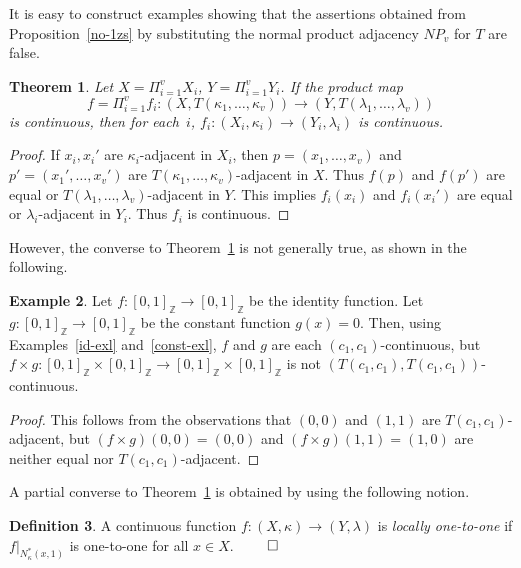 \documentclass{article}
\theoremstyle{plain}
\newtheorem{thm}{Theorem}
\theoremstyle{definition}
\newtheorem{definition}[thm]{Definition}
\newtheorem{exl}[thm]{Example}
\numberwithin{thm}{section}
\def\Z{{\mathbb Z}}
\begin{document}
It is easy to construct examples showing that the assertions obtained
from Proposition~\ref{no-1zs} by
substituting the normal product
adjacency $NP_v$ for $T$ are false.

\begin{thm}
\label{prod-cont-implies-factor}
Let $X=\Pi_{i=1}^v X_i$, $Y=\Pi_{i=1}^v Y_i$.
If the product map
\[ f=\Pi_{i=1}^v f_i: (X, T(\kappa_1,\ldots,\kappa_v)) \to (Y, T(\lambda_1, \ldots, \lambda_v)) \]
is continuous, then for each~$i$,
$f_i: (X_i,\kappa_i) \to (Y_i,\lambda_i)$ is
continuous.
\end{thm}

\begin{proof}
If $x_i, x_i'$ are $\kappa_i$-adjacent
in $X_i$, then
$p=(x_1,\ldots,x_v)$ and $p'=(x_1',\ldots,x_v')$
are $T(\kappa_1,\ldots,\kappa_v)$-adjacent
in $X$. Thus $f(p)$ and $f(p')$ are equal or
$T(\lambda_1,\ldots,\lambda_v)$-adjacent in $Y$.
This implies $f_i(x_i)$ and $f_i(x_i')$ are
equal or $\lambda_i$-adjacent in $Y_i$.
Thus $f_i$ is continuous.
\end{proof}

However, the converse to
Theorem~\ref{prod-cont-implies-factor} is
not generally true, as shown in the following.

\begin{exl}
\label{need-local-1-1}
Let $f: [0,1]_{\Z} \to [0,1]_{\Z}$ be the identity
function. Let $g: [0,1]_{\Z} \to [0,1]_{\Z}$ be the
constant function $g(x)=0$. Then, using
Examples~\ref{id-exl} and~\ref{const-exl}, $f$ and $g$ are
each $(c_1,c_1)$-continuous, but
$f \times g: [0,1]_{\Z} \times [0,1]_{\Z} \to
[0,1]_{\Z} \times [0,1]_{\Z}$ is not
$(T(c_1,c_1),T(c_1,c_1))$-continuous.
\end{exl}

\begin{proof} This follows from the observations
that $(0,0)$ and $(1,1)$ are $T(c_1,c_1)$-adjacent,
but $(f \times g)(0,0)=(0,0)$ and $(f \times g)(1,1)=(1,0)$ are 
neither equal nor $T(c_1,c_1)$-adjacent.
\end{proof}

A partial converse to
Theorem~\ref{prod-cont-implies-factor} is obtained by using
the following notion.

\begin{definition}
A continuous function
$f: (X, \kappa) \to (Y, \lambda)$ is
{\em locally one-to-one} if
$f|_{N_{\kappa}^*(x,1)}$ is one-to-one for all
$x \in X$. $\qed$
\end{definition}
\end{document}
